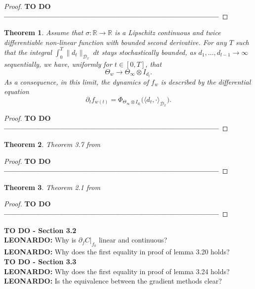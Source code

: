 \documentclass[11pt, a4paper]{article}
\newtheorem{theorem}{Theorem}[section]
\newcommand{\R}{\mathbb{R}}
\newcommand{\D}{\mathcal{D}}
\begin{document}
\begin{proof}
\textbf{TO DO ---------------------------------------------------------------------------------}
\end{proof}

\begin{theorem}
Assume that $\sigma : \R \to \R$ is a Lipschitz continuous and twice differentiable non-linear function with bounded second derivative. For any $T$ such that the integral $\int_{0}^{T} \| d_t \|_{\D_x} \ dt$ stays stochastically bounded, as $d_1, \dots, d_{l-1} \to \infty$ sequentially, we have, uniformly for $t \in [0,T]$, that
\[ \Theta_w \to \Theta_{\infty} \otimes I_{d_l}. \]
As a consequence, in this limit, the dynamics of $f_w$ is described by the differential equation
\[ \partial_tf_{w(t)} = \Phi_{\Theta_{\infty} \otimes I_{d_l}} \Big ( \big \langle d_t, \cdot \big \rangle_{\D_x} \Big ). \]
\end{theorem}

\begin{proof}
\textbf{TO DO ---------------------------------------------------------------------------------}
\end{proof}

\begin{theorem} \label{thm:stieltjes}
Theorem 3.7 from \cite{Stieltjes}
\end{theorem}

\begin{proof}
\textbf{TO DO ---------------------------------------------------------------------------------}
\end{proof}

\begin{theorem} \label{thm:linear}
Theorem 2.1 from \cite{Linear}
\end{theorem}

\begin{proof}
\textbf{TO DO ---------------------------------------------------------------------------------}
\end{proof}

\pagebreak
\textbf{TO DO - Section 3.2} \\
\textbf{LEONARDO:} Why is $\partial_{f} C |_{f_0}$ linear and continuous? \\
\textbf{LEONARDO:} Why does the first equality in proof of lemma 3.20 holds? \\

\textbf{TO DO - Section 3.3} \\
\textbf{LEONARDO:} Why does the first equality in proof of lemma 3.24 holds? \\
\textbf{LEONARDO:} Is the equivalence between the gradient methods clear? \\
\end{document}
